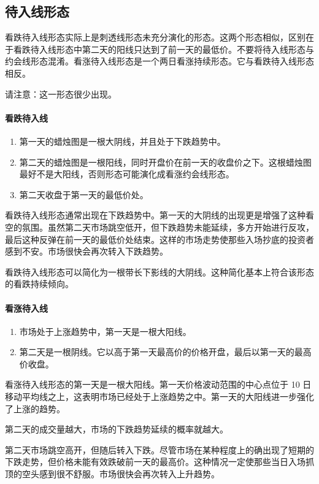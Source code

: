 \subsection{待入线形态}
看跌待入线形态实际上是刺透线形态未充分演化的形态。这两个形态相似，区别在于看跌待入线形态中第二天的阳线只达到了前一天的最低价。不要将待入线形态与约会线形态混淆。看涨待入线形态是一个两日看涨持续形态。它与看跌待入线形态相反。

请注意：这一形态很少出现。

\paragraph{看跌待入线}
\begin{enumerate}
    \item 第一天的蜡烛图是一根大阴线，并且处于下跌趋势中。
    \item 第二天的蜡烛图是一根阳线，同时开盘价在前一天的收盘价之下。这根蜡烛图最好不是大阳线，否则形态可能演化成看涨约会线形态。
    \item 第二天收盘于第一天的最低价处。
\end{enumerate}

看跌待入线形态通常出现在下跌趋势中。第一天的大阴线的出现更是增强了这种看空的氛围。虽然第二天市场跳空低开，但下跌趋势未能延续，多方开始进行反攻，最后这种反弹在前一天的最低价处结束。这样的市场走势使那些入场抄底的投资者感到不安。市场很快会再次转入下跌趋势。

看跌待入线形态可以简化为一根带长下影线的大阴线。这种简化基本上符合该形态的看跌持续倾向。

\paragraph{看涨待入线}
\begin{enumerate}
    \item 市场处于上涨趋势中，第一天是一根大阳线。
    \item 第二天是一根阴线。它以高于第一天最高价的价格开盘，最后以第一天的最高价收盘。
\end{enumerate}

看涨待入线形态的第一天是一根大阳线。第一天价格波动范围的中心点位于 10 日移动平均线之上，这表明市场已经处于上涨趋势之中。第一天的大阳线进一步强化了上涨的趋势。

第二天的成交量越大，市场的下跌趋势延续的概率就越大。

第二天市场跳空高开，但随后转入下跌。尽管市场在某种程度上的确出现了短期的下跌走势，但价格未能有效跌破前一天的最高价。这种情况一定使那些当日入场抓顶的空头感到很不舒服。市场很快会再次转入上升趋势。

